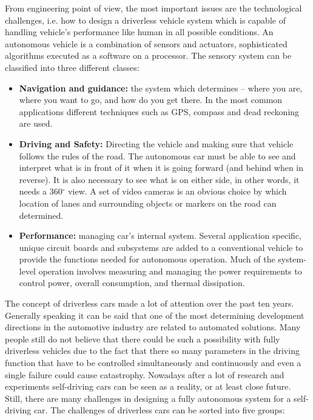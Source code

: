 \documentclass[12pt,english]{article}
\begin{document}
From engineering point of view, the most important issues are the technological challenges, i.e. how to design a driverless vehicle system which is capable of handling vehicle's performance like human in all possible conditions. An autonomous vehicle is a combination of sensors and actuators, sophisticated algorithms executed as a software on a processor.
The sensory system can be classified into three different classes:
\begin{itemize}
	\item \textbf{Navigation and guidance:} the system which determines – where you are, where you want to go, and how do you get there. In the most common applications different techniques such as GPS, compass and dead reckoning are used.
	\item \textbf{Driving and Safety:} Directing the vehicle and making sure that vehicle follows the rules of the road. The autonomous car must be able to see and interpret what is in front of it when it is going forward (and behind when in reverse). It is also necessary to see what is on either side, in other words, it needs a 360$^{\circ}$ view. A set of video cameras is an obvious choice by which location of lanes and surrounding objects or markers on the road can determined.
	\item \textbf{Performance:} managing car's internal system. Several application specific, unique circuit boards and subsystems are added to a conventional vehicle to provide the functions needed for autonomous operation. Much of the system-level operation involves measuring and managing the power requirements to control power, overall consumption, and thermal dissipation.
\end{itemize}

The concept of driverless cars made a lot of attention over the past ten years. Generally speaking it can be said that one of the most determining development directions in the automotive industry are related to automated solutions. Many people still do not believe that there could be such a possibility with fully driverless vehicles due to the fact that there so many parameters in the driving function that have to be controlled simultaneously and continuously and even a single failure could cause catastrophy. Nowadays after a lot of research and experiments self-driving cars can be seen as a reality, or at least close future. Still, there are many challenges in designing a fully autonomous system for a self-driving car. The challenges of driverless cars can be sorted into five groups:
\end{document}
